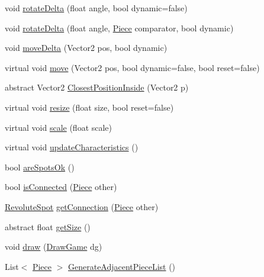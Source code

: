 \begin{DoxyCompactItemize}
\item 
void \hyperlink{classgearit_1_1src_1_1robot_1_1_piece_a7cb7f9b0b1a8c277fa3b3180763b46e9}{rotate\+Delta} (float angle, bool dynamic=false)
\item 
void \hyperlink{classgearit_1_1src_1_1robot_1_1_piece_ab9042e8988624edb637536df1a6f71a1}{rotate\+Delta} (float angle, \hyperlink{classgearit_1_1src_1_1robot_1_1_piece}{Piece} comparator, bool dynamic)
\item 
void \hyperlink{classgearit_1_1src_1_1robot_1_1_piece_af8107105b20d1016dc0788ffd49ceaba}{move\+Delta} (Vector2 pos, bool dynamic)
\item 
virtual void \hyperlink{classgearit_1_1src_1_1robot_1_1_piece_a65658f471e89011981559b9cbb2ae6ce}{move} (Vector2 pos, bool dynamic=false, bool reset=false)
\item 
abstract Vector2 \hyperlink{classgearit_1_1src_1_1robot_1_1_piece_a29b20ef39df90622eee472d713ddb8ff}{Closest\+Position\+Inside} (Vector2 p)
\item 
virtual void \hyperlink{classgearit_1_1src_1_1robot_1_1_piece_a2f7dafb3dd4f686b1277f0e009ff92ed}{resize} (float size, bool reset=false)
\item 
virtual void \hyperlink{classgearit_1_1src_1_1robot_1_1_piece_ac21fce159c527c84b1227f26eba00457}{scale} (float scale)
\item 
virtual void \hyperlink{classgearit_1_1src_1_1robot_1_1_piece_aff24ce3e57f43eb7ba0c21d00ba0179b}{update\+Characteristics} ()
\item 
bool \hyperlink{classgearit_1_1src_1_1robot_1_1_piece_ac40f288c13629341a7477ddad59cf1b4}{are\+Spots\+Ok} ()
\item 
bool \hyperlink{classgearit_1_1src_1_1robot_1_1_piece_a14b100be1ce29f8e50f7a4a37f252394}{is\+Connected} (\hyperlink{classgearit_1_1src_1_1robot_1_1_piece}{Piece} other)
\item 
\hyperlink{classgearit_1_1src_1_1robot_1_1_revolute_spot}{Revolute\+Spot} \hyperlink{classgearit_1_1src_1_1robot_1_1_piece_a859ba487a030c5e83e1cd646660f6c38}{get\+Connection} (\hyperlink{classgearit_1_1src_1_1robot_1_1_piece}{Piece} other)
\item 
abstract float \hyperlink{classgearit_1_1src_1_1robot_1_1_piece_a003b880cb315dcbd5564e987b807a533}{get\+Size} ()
\item 
void \hyperlink{classgearit_1_1src_1_1robot_1_1_piece_abf64586f3b69920173b94734f8c5ad3b}{draw} (\hyperlink{classgearit_1_1src_1_1_draw_game}{Draw\+Game} dg)
\item 
List$<$ \hyperlink{classgearit_1_1src_1_1robot_1_1_piece}{Piece} $>$ \hyperlink{classgearit_1_1src_1_1robot_1_1_piece_a63284f83e676fed914d604bb63b3bafa}{Generate\+Adjacent\+Piece\+List} ()

\end{DoxyCompactItemize}
